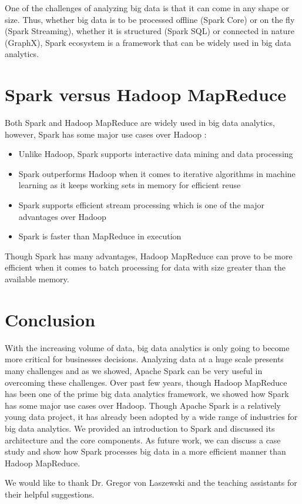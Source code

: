 \documentclass[sigconf]{acmart}
\begin{document}
One of the challenges of analyzing big data is that it can come in any shape or size. Thus, whether big data is to be processed offline (Spark Core) or on the fly (Spark Streaming), whether it is structured (Spark SQL) or connected in nature (GraphX), Spark ecosystem is a framework that can be widely used in big data analytics.

\section{Spark versus Hadoop MapReduce}
Both Spark and Hadoop MapReduce are widely used in big data analytics, however, Spark has some major use cases over Hadoop \cite{verma2016big-p3}:
\begin{itemize}
	\item Unlike Hadoop, Spark supports interactive data mining and data processing
  \item Spark outperforms Hadoop when it comes to iterative algorithms in machine learning as it keeps working sets in memory for efficient reuse  
  \item Spark supports efficient stream processing which is one of the major advantages over Hadoop
  \item Spark is faster than MapReduce in execution
\end{itemize}

Though Spark has many advantages, Hadoop MapReduce can prove to be more efficient when it comes to batch processing for data with size greater than the available memory.

\section{Conclusion}
With the increasing volume of data, big data analytics is only going to become more critical for businesses decisions. Analyzing data at a huge scale presents many challenges and as we showed, Apache Spark can be very useful in overcoming these challenges. Over past few years, though Hadoop MapReduce has been one of the prime big data analytics framework, we showed how Spark has some major use cases over Hadoop. Though Apache Spark is a relatively young data project, it has already been adopted by a wide range of industries for big data analytics. We provided an introduction to Spark and discussed its architecture and the core components. As future work, we can discuss a case study and show how Spark processes big data in a more efficient manner than Hadoop MapReduce.

\begin{acks}

  We would like to thank Dr. Gregor von Laszewski and the teaching assistants for their helpful suggestions. 

\end{acks}


 
\end{document}
